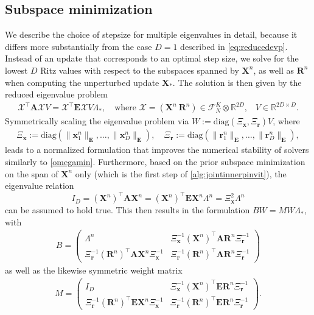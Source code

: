 \documentclass[a4paper,11pt,oneside]{amsart}
\theoremstyle{definition}
\theoremstyle{remark}
\newcommand{\A}{\ten A}
\newcommand{\E}{\ten E}
\newcommand{\R}{\mathbb{R}}
\newcommand{\ten}[1]{\boldsymbol{#1}}
\newcommand{\trp}{\top}
\numberwithin{equation}{section}
\numberwithin{theorem}{section}
\begin{document}
\subsection{Subspace minimization}\label{ssc:stepsize}
We describe the choice of stepsize for multiple eigenvalues in detail, because it differs more substantially from the case $D = 1$ described in \cref{eq:reducedevp}. Instead of an update that corresponds to an optimal step size, we solve for the lowest $D$ Ritz values with respect to the subspaces spanned by $\ten X^n$, as well as $\ten R^n$ when computing the unperturbed update $\ten X_\ast$. The solution is then given by the reduced eigenvalue problem
\begin{align*}
%
%
  \ten{\mathcal{X}}^\trp \A  \ten{\mathcal{X}} V =  \ten{\mathcal{X}}^\trp \E  \ten{\mathcal{X}} V \Lambda_\ast , \quad
\text{where $\ten{\mathcal{X}} = (\ten{X}^n\ \ten{R}^n) \in \mathcal{F}_N^K \otimes \R^{2D}$,} \quad V \in \R^{2D \times D}. %
\end{align*}
Symmetrically scaling the eigenvalue problem via $W := \mathrm{diag}(\Xi_{\ten x},\Xi_{\ten r}) V$, where
\begin{align}\label{eq:subspacerescale}
 \Xi_{\ten x} := \mathrm{diag}(\|\ten{x}^n_1\|_{\E}, \ldots, \|\ten{x}^n_D\|_{\E}), \quad \Xi_{\ten r} := \mathrm{diag}(\|\ten{r}^n_1\|_{\E}, \ldots, \|\ten{r}^n_D\|_{\E}),
\end{align}
leads to a normalized formulation that improves the numerical stability of solvers similarly to \cref{omegamin}. Furthermore, based on the prior subspace minimization on the span of $\ten X^n$ only (which is the first step of \cref{alg:jointinnerpinvit}), the eigenvalue relation
\begin{equation}\label{eq:Xnnormal}
I_D = (\ten X^n)^\trp \A \ten X^n = (\ten X^n)^\trp \E \ten X^n \Lambda^n = \Xi_{\ten x}^2 \Lambda^n
\end{equation}
can be assumed to hold true. This then results in the formulation $B W = M W \Lambda_\ast$, with 
%
%
%
%
\begin{align*}
B =
\begin{pmatrix}
 \Lambda^n & \Xi_{\ten x}^{-1} (\ten{X}^n)^\trp \A \ten R^n \Xi_{\ten r}^{-1} \\
\Xi_{\ten r}^{-1} (\ten R^n)^\trp \A \ten{X}^n \Xi_{\ten x}^{-1} & \Xi_{\ten r}^{-1} (\ten R^n)^\trp \A \ten R^n \Xi_{\ten r}^{-1}
\end{pmatrix}
\end{align*}
as well as the likewise symmetric weight matrix
%
%
%
%
%
%
%
%
\begin{align*}
M =
\begin{pmatrix}
 I_D & \Xi_{\ten x}^{-1} (\ten{X}^n)^\trp \E \ten R^n \Xi_{\ten r}^{-1} \\
\Xi_{\ten r}^{-1} (\ten R^n)^\trp \E \ten{X}^n \Xi_{\ten x}^{-1} & \Xi_{\ten r}^{-1} (\ten R^n)^\trp \E \ten R^n \Xi_{\ten r}^{-1}
\end{pmatrix}.
%
%
%
%
%
%
%
%
\end{align*}
\end{document}
